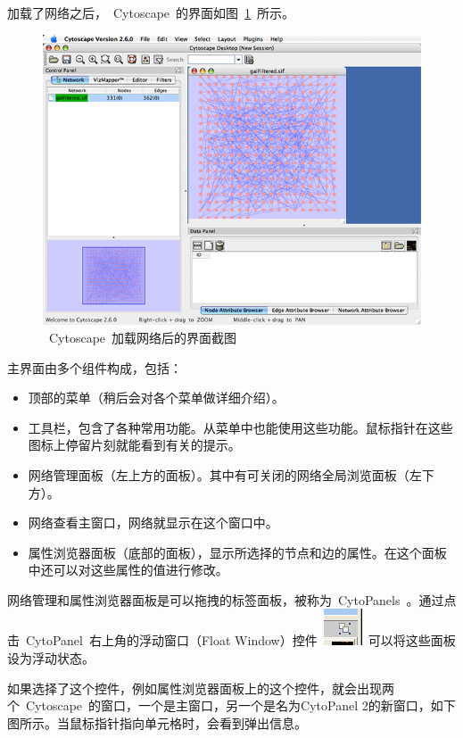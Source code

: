 加载了网络之后，~Cytoscape~的界面如图~\ref{fig:2.1}~所示。

\begin{figure}[!h]
\centering
\includegraphics[width=\textwidth]{images/cytoscape_startup_network_26.png}
\caption{~Cytoscape~加载网络后的界面截图}
\label{fig:2.1}
\end{figure}

主界面由多个组件构成，包括：
\begin{itemize}
\item 顶部的菜单（稍后会对各个菜单做详细介绍）。
\item 工具栏，包含了各种常用功能。从菜单中也能使用这些功能。鼠标指针在这些图标上停留片刻就能看到有关的提示。
\item 网络管理面板（左上方的面板）。其中有可关闭的网络全局浏览面板（左下方）。
\item 网络查看主窗口，网络就显示在这个窗口中。
\item 属性浏览器面板（底部的面板），显示所选择的节点和边的属性。在这个面板中还可以对这些属性的值进行修改。
\end{itemize}

网络管理和属性浏览器面板是可以拖拽的标签面板，被称为~CytoPanels~。通过点击~CytoPanel~右上角的浮动窗口（Float Window）控件~\includegraphics[width=.5cm]{images/float_icon.png}~可以将这些面板设为浮动状态。

如果选择了这个控件，例如属性浏览器面板上的这个控件，就会出现两个~Cytoscape~的窗口，一个是主窗口，另一个是名为CytoPanel 2的新窗口，如下图所示。当鼠标指针指向单元格时，会看到弹出信息。


